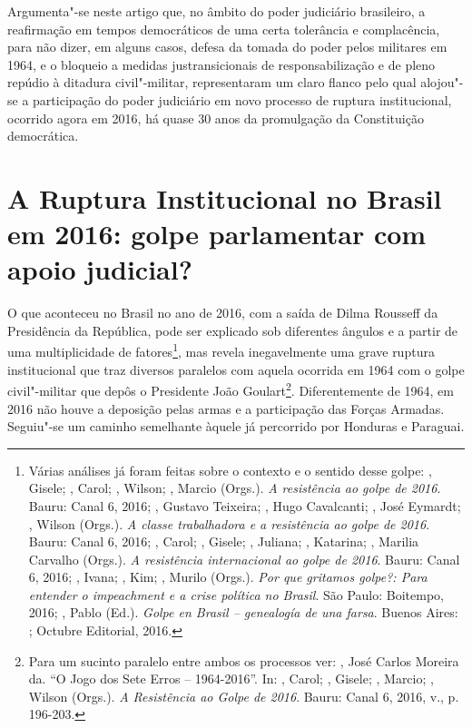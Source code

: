 Argumenta"-se neste artigo que, no âmbito do poder judiciário brasileiro,
a reafirmação em tempos democráticos de uma certa tolerância e
complacência, para não dizer, em alguns casos, defesa da tomada do poder
pelos militares em 1964, e o bloqueio a medidas justransicionais de
responsabilização e de pleno repúdio à ditadura civil"-militar,
representaram um claro flanco pelo qual alojou"-se a participação do
poder judiciário em novo processo de ruptura institucional, ocorrido
agora em 2016, há quase 30 anos da promulgação da Constituição
democrática.

\section{A Ruptura Institucional no Brasil em 2016: golpe parlamentar
com apoio judicial?}

O que aconteceu no Brasil no ano de 2016, com a saída de Dilma Rousseff
da Presidência da República, pode ser explicado sob diferentes ângulos e
a partir de uma multiplicidade de fatores\footnote{Várias análises já
  foram feitas sobre o contexto e o sentido desse golpe: ,
  Gisele; , Carol;  , Wilson; , Marcio (Orgs.).
  \emph{A resistência ao golpe de 2016}. Bauru: Canal 6, 2016; ,
  Gustavo Teixeira;  , Hugo Cavalcanti;
  , José Eymardt; 
  , Wilson (Orgs.). \emph{A classe trabalhadora e
  a resistência ao golpe de 2016}. Bauru: Canal 6, 2016; , Carol;
  , Gisele; ,
  Juliana; , Katarina;
  , Marilia Carvalho (Orgs.). \emph{A resistência
  internacional ao golpe de 2016}. Bauru: Canal 6, 2016; ,
  Ivana; , Kim; , Murilo (Orgs.). \emph{Por que gritamos
  golpe?: Para entender o impeachment e a crise política no Brasil}. São
  Paulo: Boitempo, 2016; , Pablo (Ed.). \emph{Golpe en Brasil
  -- genealogía de una farsa}. Buenos Aires: ; Octubre Editorial,
  2016.}, mas revela inegavelmente uma grave ruptura institucional que
traz diversos paralelos com aquela ocorrida em 1964 com o golpe
civil"-militar que depôs o Presidente João Goulart\footnote{Para um
  sucinto paralelo entre ambos os processos ver: , José
  Carlos Moreira da. ``O Jogo dos Sete Erros -- 1964-2016''. In: ,
  Carol; , Gisele; , Marcio;  , Wilson
  (Orgs.). \emph{A Resistência ao Golpe de 2016}. Bauru: Canal 6,
  2016, v., p. 196-203.}. Diferentemente de 1964, em 2016 não houve a
deposição pelas armas e a participação das Forças Armadas. Seguiu"-se um
caminho semelhante àquele já percorrido por Honduras e Paraguai.

